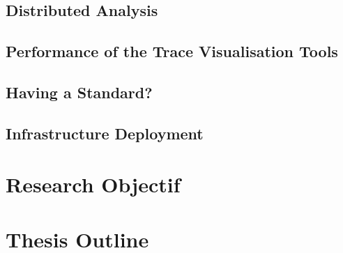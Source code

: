 \subsection{Distributed Analysis}

\subsection{Performance of the Trace Visualisation Tools}

\subsection{Having a Standard?}

\subsection{Infrastructure Deployment}




\section{Research Objectif}  %


\section{Thesis Outline}  %
